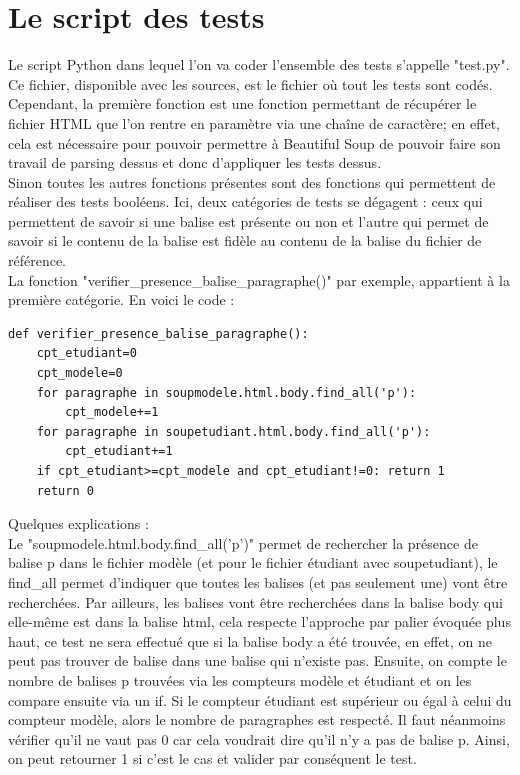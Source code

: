 \documentclass[12pt,twoside]{book}
\begin{document}
\section{Le script des tests}
Le script Python dans lequel l'on va coder l'ensemble des tests s'appelle "test.py". Ce fichier, disponible avec les sources, est le fichier où tout les tests sont codés.\\
Cependant, la première fonction est une fonction permettant de récupérer le fichier HTML que l'on rentre en paramètre via une chaîne de caractère; en effet, cela est nécessaire pour pouvoir permettre à Beautiful Soup de pouvoir faire son travail de parsing dessus et donc d'appliquer les tests dessus. \\
Sinon toutes les autres fonctions présentes sont des fonctions qui permettent de réaliser des tests booléens. Ici, deux catégories de tests se dégagent : ceux qui permettent de savoir si une balise est présente ou non et l'autre qui permet de savoir si le contenu de la balise est fidèle au contenu de la balise du fichier de référence.\\
La fonction "verifier\_presence\_balise\_paragraphe()" par exemple, appartient à la première catégorie. En voici le code : \\
\begin{lstlisting}
def verifier_presence_balise_paragraphe():
	cpt_etudiant=0
	cpt_modele=0
	for paragraphe in soupmodele.html.body.find_all('p'):
		cpt_modele+=1
	for paragraphe in soupetudiant.html.body.find_all('p'):
		cpt_etudiant+=1
	if cpt_etudiant>=cpt_modele and cpt_etudiant!=0: return 1
	return 0
\end{lstlisting}
Quelques explications : \\
Le "soupmodele.html.body.find\_all('p')" permet de rechercher la présence de balise p dans le fichier modèle (et pour le fichier étudiant avec soupetudiant), le find\_all permet d'indiquer que toutes les balises (et pas seulement une) vont être recherchées. Par ailleurs, les balises vont être recherchées dans la balise body qui elle-même est dans la balise html, cela respecte l'approche par palier évoquée plus haut, ce test ne sera effectué que si la balise body a été trouvée, en effet, on ne peut pas trouver de balise dans une balise qui n'existe pas. Ensuite, on compte le nombre de balises p trouvées via les compteurs modèle et étudiant et on les compare ensuite via un if. Si le compteur étudiant est supérieur ou égal à celui du compteur modèle, alors le nombre de paragraphes est respecté. Il faut néanmoins vérifier qu'il ne vaut pas 0 car cela voudrait dire qu'il n'y a pas de balise p. Ainsi, on peut retourner 1 si c'est le cas et valider par conséquent le test.\\
\end{document}
